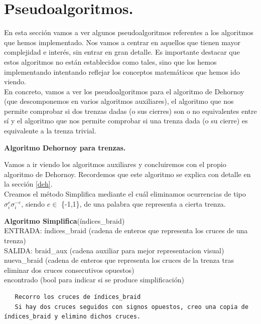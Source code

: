 \newpage
\section{Pseudoalgoritmos.}
En esta sección vamos a ver algunos pseudoalgoritmos referentes a los algoritmos que hemos implementado. Nos vamos a centrar en aquellos que tienen mayor complejidad e interés, sin entrar en gran detalle. Es importante destacar que estos algoritmos no están establecidos como tales, sino que los hemos implementando intentando reflejar los conceptos matemáticos que hemos ido viendo. \\

En concreto, vamos a ver los pseudoalgoritmos para el algoritmo de Dehornoy (que descomponemos en varios algoritmos auxiliares), el algoritmo que nos permite comprobar si dos trenzas dadas (o sus cierres) son o no equivalentes entre sí y el algoritmo que nos permite comprobar si una trenza dada (o su cierre) es equivalente a la trenza trivial.\\

\begin{center}
	\textbf{Algoritmo Dehornoy para trenzas.}
\end{center} 
Vamos a ir viendo los algoritmos auxiliares y concluiremos con el propio algoritmo de Dehornoy. Recordemos que este algoritmo se explica con detalle en la sección \ref{deh}.\\

Creamos el método Simplifica mediante el cuál eliminamos ocurrencias de tipo $\sigma_{i}^{e}\sigma_{i}^{-e}$, siendo $ e \in$ \{-1,1\}, de una palabra que representa a cierta trenza. 

\begin{alg}
	\textbf{Algoritmo Simplifica}(índices\_braid)\\
	ENTRADA: índices\_braid (cadena de enteros que representa los cruces de una trenza)\\
	SALIDA: \hspace{0.4cm} braid\_aux (cadena auxiliar para mejor representacion visual) \\
    \hspace*{2.2cm} nueva\_braid (cadena de enteros que representa los cruces de la trenza tras eliminar dos cruces consecutivos opuestos)\\
    \hspace*{2.2cm} encontrado (bool para indicar si se produce simplificación)
	
\begin{lstlisting}
   Recorro los cruces de índices_braid
   Si hay dos cruces seguidos con signos opuestos, creo una copia de índices_braid y elimino dichos cruces. 
\end{lstlisting}
\end{alg}

